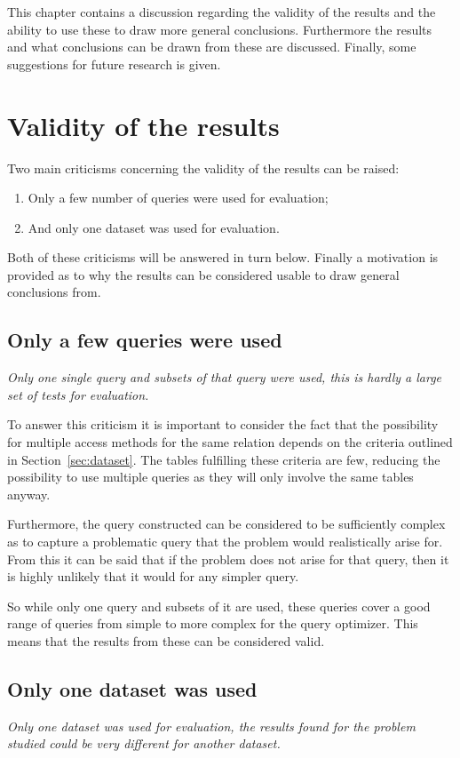 This chapter contains a discussion regarding the validity of the results and the
ability to use these to draw more general conclusions. Furthermore the results
and what conclusions can be drawn from these are discussed. Finally, some
suggestions for future research is given.

\section{Validity of the results}\label{sec:validity}
Two main criticisms concerning the validity of the results can be raised:
\begin{enumerate}
\item Only a few number of queries were used for evaluation;
\item And only one dataset was used for evaluation.
\end{enumerate}

Both of these criticisms will be answered in turn below. Finally a motivation
is provided as to why the results can be considered usable to draw general conclusions from.

\subsection{Only a few queries were used}
\textit{Only one single query and subsets of that query were used, this is hardly a
  large set of tests for evaluation.}

To answer this criticism it is important to consider the fact that the
possibility for multiple access methods for the same relation depends on the
criteria outlined in Section~\ref{sec:dataset}. The tables fulfilling these
criteria are few, reducing the possibility to use multiple queries as they will
only involve the same tables anyway.

Furthermore, the query constructed can be considered to be sufficiently complex
as to capture a problematic query that the problem would realistically arise
for. From this it can be said that if the problem does not arise for that query,
then it is highly unlikely that it would for any simpler query.

So while only one query and subsets of it are used, these queries cover a good
range of queries from simple to more complex for the query optimizer. This means
that the results from these can be considered valid.

\subsection{Only one dataset was used}
\textit{Only one dataset was used for evaluation, the results found for the
  problem studied could be very different for another dataset.}


